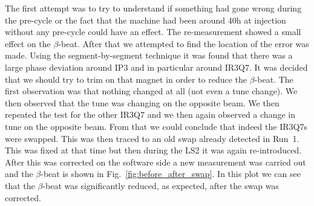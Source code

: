 \documentclass[a4paper]{cernatsnote}
\begin{document}
The first attempt was to try to understand if something had gone wrong during the pre-cycle or the fact that the machine had been around 40h at injection without any pre-cycle could have an effect. The re-measurement showed a small effect on the $\beta$-beat. After that we attempted to find the location of the error was made. Using the segment-by-segment technique it was found that there was a large phase deviation around IP3 and in particular around IR3Q7. It was decided that we should try to trim on that magnet in order to reduce the $\beta$-beat. The first observation was that nothing changed at all (not even a tune change). We then observed that the tune was changing on the opposite beam. We then repeated the test for the other IR3Q7 and we then again observed a change in tune on the opposite beam. From that we could conclude that indeed the IR3Q7s were swapped. This was then traced to an old swap already detected in Run~1. This was fixed at that time but then during the LS2 it was again re-introduced. After this was corrected on the software side a new measurement was carried out and the $\beta$-beat is shown in Fig.~\ref{fig:before_after_swap}. In this plot we can see that the $\beta$-beat was significantly reduced, as expected, after the swap was corrected.  
\end{document}
